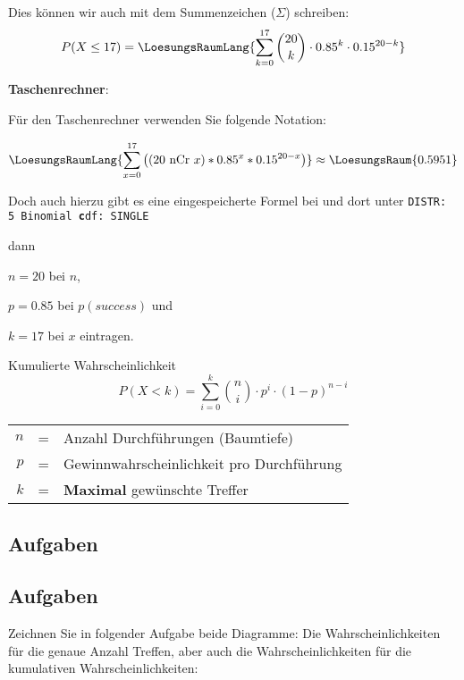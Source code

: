 Dies können wir auch mit dem Summenzeichen ($\Sigma$) schreiben:
$$P(X\le 17) = \LoesungsRaumLang{\sum_{k=0}^{17} {20 \choose k} \cdot 0.85^k \cdot 0.15^{20-k}}$$

\newpage
\textbf{Taschenrechner}:

\leserluft

Für den Taschenrechner verwenden Sie folgende Notation: 

$$\LoesungsRaumLang{\sum_{x=0}^{17}\left(( 20 \textrm{\,\,nCr\,\,} x ) * 0.85^x *
0.15^{20-x}\right)} \approx \LoesungsRaum{0.5951}$$


Doch auch hierzu gibt es eine eingespeicherte Formel
bei
 und dort unter \texttt{DISTR: 5
  Binomial\textbf{\color{red} c}df: SINGLE}

dann

$n=20$ bei $n$,

$p=0.85$ bei $p(success)$ und

$k=17$ bei $x$ eintragen.



\begin{gesetz}{Kumulierte Wahrscheinlichkeit}{}
  $$P(X < k) = \sum_{i=0}^k {n \choose i} \cdot{} p^i \cdot{} (1-p)^{n-i}$$


\begin{tabular}{rcl}
  $n$ &=& Anzahl Durchführungen (Baumtiefe)\\
  $p$ &=& Gewinnwahrscheinlichkeit pro Durchführung\\
  $k$ &=& \textbf{Maximal} gewünschte Treffer\\
\end{tabular}

\end{gesetz}


\subsection*{Aufgaben}

\newpage

\subsection*{Aufgaben}

Zeichnen Sie in folgender Aufgabe beide Diagramme: Die
Wahrscheinlichkeiten für die genaue Anzahl Treffen, aber auch die
Wahrscheinlichkeiten für die kumulativen Wahrscheinlichkeiten:

